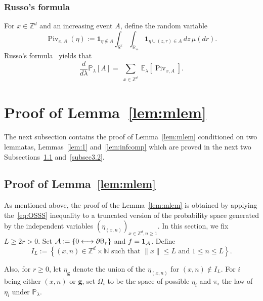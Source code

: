 \documentclass[10pt]{amsart}
\theoremstyle{definition}\newtheorem{defi}[theo]{Definition}\newtheorem{rema}[theo]{Remark}\newtheorem{exam}[theo]{Example}\newtheorem{exem}[theo]{Example}\newtheorem{nota}[theo]{Notation}
\newcommand{\gbf}{\mathbf{g}}
\DeclareMathOperator{\Piv}{Piv}
\begin{document}
\subsubsection{Russo's formula}
For $x\in {\mathbb Z}^d$ and an increasing event $A$, define the random variable
\begin{equation}\label{eq:pivdef}
\Piv_{x,A} (\eta) := \mathbf 1_{\eta \notin A}\int_{\mathsf S^x} \int_{{\mathbb R}_+} \mathbf 1_{\eta \cup (z, r) \in A} \,dz \, \mu(d r).
\end{equation}
Russo's formula~\cite[Equation 19.2]{LP17} yields that
\begin{equation}\label{eq:russo}
\tag{Russo}
\frac{d}{d\lambda}{\mathbb P}_\lambda [A] = \sum_{\substack{x \in {\mathbb Z}^d}} {\mathbb E}_\lambda [\Piv_{x,A}].
\end{equation}



\section{Proof of Lemma~\ref{lem:mlem}}\label{sec:3}
The next subsection contains the proof of Lemma~\ref{lem:mlem} conditioned on two lemmatas, Lemmas~\ref{lem:1} and~\ref{lem:infcomp} which are proved in the next two Subsections~\ref{subsec3.1} and~\ref{subsec3.2}.
\subsection{Proof of Lemma~\ref{lem:mlem}}\label{subsec3.1}
As mentioned above, the proof of the Lemma~\ref{lem:mlem} is obtained by applying the~\eqref{eq:OSSS} inequality to a truncated version of the probability space generated by the independent variables $(\eta_{(x,n)})_{x\in{\mathbb Z}^d,n\ge1}$. In this section, we fix $L\ge 2r>0$. Set ${\mathcal A}:=\linebreak\{0\stackrel{}\longleftrightarrow \partial\mathsf B_r\}$ and $f={\bf 1}_{\mathcal A}$. Define
\[
I_L:=\left\{(x,n)\in{\mathbb Z}^d\times{\mathbb N}\text{ such that } \|x\|\le L\text{ and }1\le n\le L\right\}.
\]

Also, for $r\ge0$, let $\eta_{\gbf}$ denote the union of the $\eta_{(x,n)}$ for $(x,n)\notin I_L$. For $i$ being either $(x,n)$ or ${\gbf}$, set $\Omega_i$ to be the space of possible $\eta_i$ and $\pi_i$ the law of $\eta_i$ under ${\mathbb P}_\lambda$.
\end{document}

